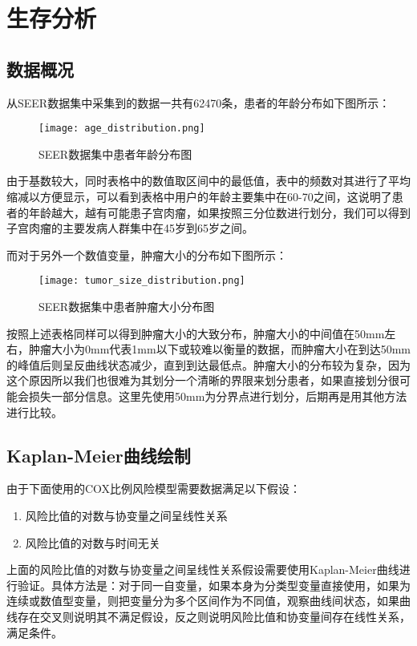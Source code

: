 \section{生存分析}

\subsection{数据概况}

从SEER数据集中采集到的数据一共有62470条，患者的年龄分布如下图所示：
\begin{figure}[!htbp]
    \centering
    \texttt{[image: age\_distribution.png]}
    \caption{SEER数据集中患者年龄分布图} \label{fig:age_distribution}
\end{figure}

由于基数较大，同时表格中的数值取区间中的最低值，表中的频数对其进行了平均缩减以方便显示，可以看到表格中用户的年龄主要集中在60-70之间，这说明了患者的年龄越大，越有可能患子宫肉瘤，如果按照三分位数进行划分，我们可以得到子宫肉瘤的主要发病人群集中在45岁到65岁之间。

而对于另外一个数值变量，肿瘤大小的分布如下图所示：

\begin{figure}[!htbp]
    \centering
    \texttt{[image: tumor\_size\_distribution.png]}
    \caption{SEER数据集中患者肿瘤大小分布图} \label{fig:tumor_size_distribution}
\end{figure}

按照上述表格同样可以得到肿瘤大小的大致分布，肿瘤大小的中间值在50mm左右，肿瘤大小为0mm代表1mm以下或较难以衡量的数据，而肿瘤大小在到达50mm的峰值后则呈反曲线状态减少，直到到达最低点。肿瘤大小的分布较为复杂，因为这个原因所以我们也很难为其划分一个清晰的界限来划分患者，如果直接划分很可能会损失一部分信息。这里先使用50mm为分界点进行划分，后期再是用其他方法进行比较。

\subsection{Kaplan-Meier曲线绘制}

由于下面使用的COX比例风险模型需要数据满足以下假设：
\begin{enumerate}
    \item 风险比值的对数与协变量之间呈线性关系
    \item 风险比值的对数与时间无关
\end{enumerate}

上面的风险比值的对数与协变量之间呈线性关系假设需要使用Kaplan-Meier曲线进行验证。具体方法是：对于同一自变量，如果本身为分类型变量直接使用，如果为连续或数值型变量，则把变量分为多个区间作为不同值，观察曲线间状态，如果曲线存在交叉则说明其不满足假设，反之则说明风险比值和协变量间存在线性关系，满足条件。

